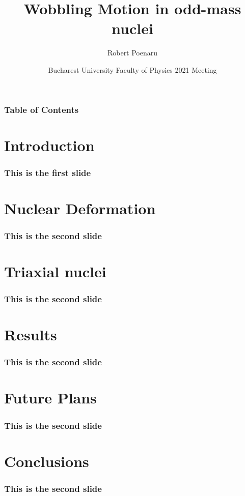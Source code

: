 \documentclass{beamer}
\title[Wobbling Motion in Odd-Mass Nuclei] %
{Wobbling Motion in odd-mass nuclei}
\author[R. Poenaru] %
{Robert Poenaru\inst{1,2}}
\institute[DFT @ IFIN-HH] %
{
  \inst{1}%
  Department of Theoretical Physics\newline
  IFIN-HH
  \and
  \inst{2}%
  Faculty of Physics\newline
  University of Bucharest
}
\date[\today] %
{Bucharest University Faculty of Physics 2021 Meeting}
\begin{document}
\maketitle
\begin{frame}
\frametitle{Table of Contents}
\tableofcontents
\section{Introduction}
\end{frame}
  \begin{frame}
    \frametitle{This is the first slide}
  \end{frame}

\section{Nuclear Deformation}
  \begin{frame}
    \frametitle{This is the second slide}
  \end{frame}
\section{Triaxial nuclei}

  \begin{frame}
    \frametitle{This is the second slide}
  \end{frame}

\section{Results}  

  \begin{frame}
    \frametitle{This is the second slide}
  \end{frame}

\section{Future Plans}

  \begin{frame}
    \frametitle{This is the second slide}
  \end{frame}

\section{Conclusions}

  \begin{frame}
    \frametitle{This is the second slide}
  \end{frame}
\end{document}

